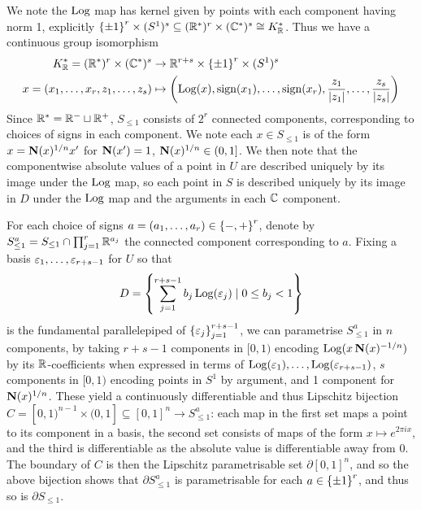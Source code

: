 \documentclass[11pt]{report}
\begin{document}
We note the $\operatorname{Log}$ map has kernel given by points with each component having norm 1, explicitly $\left\{  \pm 1  \right\}^r \times (S^1)^s \subseteq (\mathbb{R}^*)^r \times (\mathbb{C}^*)^s \cong K_{\mathbb{R}}^*$. Thus we have a continuous group isomorphism
\begin{align}
    K_{\mathbb{R}}^* = (\mathbb{R}^*)^r \times (\mathbb{C}^*)^s &\to \mathbb{R}^{r + s} \times \left\{  \pm 1  \right\}^r \times (S^1)^s \nonumber \\
    x = (x_1, \ldots, x_r, z_1, \ldots, z_s) &\mapsto \left(  \operatorname{Log}(x), \operatorname{sign}(x_1), \ldots, \operatorname{sign}(x_r), \frac{z_1}{\left| z_1 \right|}, \ldots, \frac{z_s}{\left| z_s \right|}  \right)\label{contgpiso}
\end{align}
Since $\mathbb{R}^* = \mathbb{R}^- \sqcup \mathbb{R}^+$, $S_{\leq 1}$ consists of $2^r$ connected components, corresponding to choices of signs in each component. We note each $x \in S_{\leq 1}$ is of the form $x = \operatorname{\mathbf{N}}(x)^{1/n}x'$ for $\operatorname{\mathbf{N}}(x') = 1$, $\operatorname{\mathbf{N}}(x)^{1/n} \in (0, 1]$. We then note that the componentwise absolute values of a point in $U$ are described uniquely by its image under the $\operatorname{Log}$ map, so each point in $S$ is described uniquely by its image in $D$ under the $\operatorname{Log}$ map and the arguments in each $\mathbb{C}$ component. 

For each choice of signs $a = (a_1, \ldots, a_r) \in \left\{  -, +  \right\}^r$, denote by $S_{\leq 1}^a = S_{\leq 1} \cap \prod_{j = 1}^r\mathbb{R}^{a_j}$ the connected component corresponding to $a$. Fixing a basis $\varepsilon_1, \ldots, \varepsilon_{r + s - 1}$ for $U$ so that 
$$
    D = \left\{  \sum_{j = 1}^{r + s - 1} b_j\operatorname{Log}(\varepsilon_j) \mid 0 \leq b_j < 1  \right\}
$$
is the fundamental parallelepiped of $\left\{  \varepsilon_j  \right\}_{j = 1}^{r + s - 1}$, we can parametrise $S_{\leq 1}^a$ in $n$ components, by taking $r + s - 1$ components in $[0, 1)$ encoding $\operatorname{Log}(x\operatorname{\mathbf{N}}(x)^{-1/n})$ by its $\mathbb{R}$-coefficients when expressed in terms of $\operatorname{Log}(\varepsilon_1), \ldots, \operatorname{Log}(\varepsilon_{r + s - 1})$, $s$ components in $[0, 1)$ encoding points in $S^1$ by argument, and 1 component for $\operatorname{\mathbf{N}}(x)^{1/n}$. These yield a continuously differentiable and thus Lipschitz bijection ${C = [0, 1)^{n - 1} \times (0, 1] \subseteq [0, 1]^n \to S_{\leq 1}^a}$: each map in the first set maps a point to its component in a basis, the second set consists of maps of the form $x \mapsto e^{2\pi i x}$, and the third is differentiable as the absolute value is differentiable away from $0$. The boundary of $C$ is then the Lipschitz parametrisable set $\partial [0, 1]^n$, and so the above bijection shows that $\partial S_{\leq 1}^a$ is parametrisable for each $a \in \left\{  \pm 1  \right\}^r$, and thus so is $\partial S_{\leq 1}$.
\end{document}
